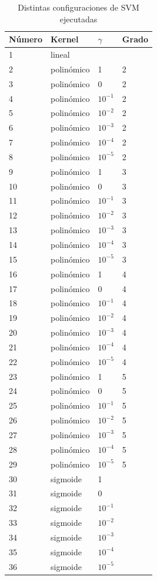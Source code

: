 \documentclass[journal]{IEEEtran}
\begin{document}
\begin{table}[ht!]
\caption{Distintas configuraciones de SVM ejecutadas}
\label{table:svm_config}
\centering
\begin{tabular}{l | l l l }
Número & Kernel & $\gamma$ & Grado  \\
\hline
1 & lineal &  &  \\ 
2 & polinómico & 1  & 2 \\ 
3  & polinómico & 0  & 2 \\ 
4  & polinómico & $ 10^{-1} $  & 2 \\ 
5  & polinómico & $ 10^{-2} $  & 2 \\ 
6  & polinómico & $ 10^{-3} $  & 2 \\ 
7  & polinómico & $ 10^{-4} $  & 2 \\ 
8  & polinómico & $ 10^{-5} $  & 2 \\ 
9  & polinómico & 1  & 3 \\ 
10 & polinómico & 0  & 3 \\ 
11 & polinómico & $ 10^{-1} $  & 3 \\ 
12 & polinómico & $ 10^{-2} $  & 3 \\ 
13 & polinómico & $ 10^{-3} $  & 3 \\ 
14 & polinómico & $ 10^{-4} $  & 3 \\ 
15 & polinómico & $ 10^{-5} $  & 3 \\ 
16 & polinómico & 1  & 4 \\ 
17 & polinómico & 0  & 4 \\ 
18 & polinómico & $ 10^{-1} $  & 4 \\ 
19 & polinómico & $ 10^{-2} $  & 4 \\ 
20 & polinómico & $ 10^{-3} $  & 4 \\ 
21 & polinómico & $ 10^{-4} $  & 4 \\ 
22 & polinómico & $ 10^{-5} $  & 4 \\ 
23 & polinómico & 1  & 5 \\ 
24 & polinómico & 0  & 5 \\ 
25 & polinómico & $ 10^{-1} $  & 5 \\ 
26 & polinómico & $ 10^{-2} $  & 5 \\ 
27 & polinómico & $ 10^{-3} $  & 5 \\ 
28 & polinómico & $ 10^{-4} $  & 5 \\ 
29 & polinómico & $ 10^{-5} $  & 5 \\ 
30 & sigmoide & 1 &  \\ 
31 & sigmoide & 0 &  \\ 
32 & sigmoide & $ 10^{-1} $ &  \\ 
33 & sigmoide & $ 10^{-2} $ &  \\ 
34 & sigmoide & $ 10^{-3} $ &  \\ 
35 & sigmoide & $ 10^{-4} $ &  \\ 
36 & sigmoide & $ 10^{-5} $ &  \\ 
\end{tabular}
\end{table}
\end{document}
